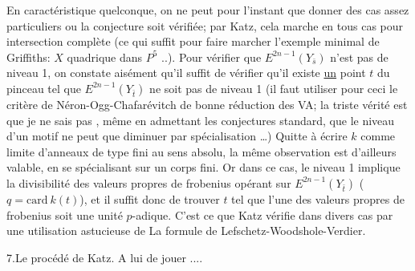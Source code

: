 En caractéristique quelconque, on ne peut pour l'instant que donner des cas assez particuliers ou la conjecture soit vérifiée; par Katz, cela marche en tous cas pour  intersection complète (ce qui suffit pour faire marcher l'exemple minimal de Griffiths: $X$ quadrique dans $P^5$ ..).  Pour vérifier que $E^{2n-1}(Y_{\bar s})$ n'est pas de niveau 1, on constate aisément qu'il suffit de vérifier qu'il existe \uline{un} point $t$ du pinceau tel que $E^{2n-1}(Y_{\bar t})$ ne soit pas de niveau 1 (il faut utiliser pour ceci le critère de Néron-Ogg-Chafarévitch de bonne réduction des VA; la triste vérité est que je ne sais pas , même en  admettant les conjectures standard, que le niveau d'un motif ne peut que diminuer par spécialisation \ldots) Quitte à écrire $k$ comme limite d'anneaux de type fini au sens absolu, la même observation est d'ailleurs valable, en se spécialisant sur un corps fini. Or dans ce cas, le niveau 1 implique la divisibilité  des valeurs propres de frobenius opérant sur $E^{2n-1}(Y_{\bar t})$  ($q=\mathrm{card}\ k(t)$), et il suffit donc de trouver $t$ tel que l'une des valeurs propres de frobenius soit une unité $p$-adique. C'est ce que Katz vérifie dans divers cas par une utilisation astucieuse de La formule de Lefschetz-Woodshole-Verdier.

7.\quad Le procédé de Katz. A lui de jouer ....
